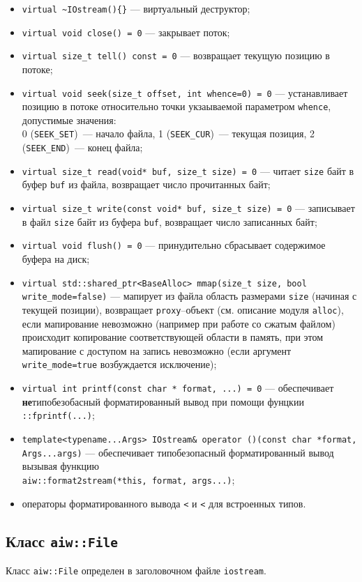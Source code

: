 \begin{itemize}
\item \verb'virtual ~IOstream(){}' --- виртуальный деструктор;
\item \verb'virtual void close() = 0' --- закрывает поток;
\item \verb'virtual size_t tell() const = 0' --- возвращает текущую позицию в потоке;
\item \verb'virtual void seek(size_t offset, int whence=0) = 0' --- устанавливает позицию в потоке относительно
  точки укзаываемой параметром \verb'whence', допустимые значения:\\
  0 (\verb'SEEK_SET')~--- начало файла, 1 (\verb'SEEK_CUR')~--- текущая позиция, 2 (\verb'SEEK_END')~--- конец файла;
\item \verb'virtual size_t read(void* buf, size_t size) = 0' --- читает \verb'size' байт в буфер \verb'buf' из файла,
  возвращает число прочитанных байт;
\item \verb'virtual size_t write(const void* buf, size_t size) = 0' --- записывает в файл \verb'size' байт из буфера \verb'buf',
  возвращает число записанных байт;
\item \verb'virtual void flush() = 0' --- принудительно сбрасывает содержимое буфера на диск;
\item \verb'virtual std::shared_ptr<BaseAlloc> mmap(size_t size, bool write_mode=false)' --- мапирует из файла область
  размерами \verb'size' (начиная с текущей позиции), возвращает \verb'proxy'--объект (см. описание модуля \verb'alloc'),
  если мапирование невозможно (например при работе со сжатым файлом) происходит копирование
  соответствующей области в память, при этом мапирование с доступом на запись невозможно
  (если аргумент \verb'write_mode=true' возбуждается исключение);
\item \verb'virtual int printf(const char * format, ...) = 0' --- обеспечивает
  {\bf не}типобезобасный форматированный вывод при помощи фунцкии \verb'::fprintf(...)';
\item \verb'template<typename...Args> IOstream& operator ()(const char *format, Args...args)' --- обеспечивает
  типобезопасный форматированный вывод вызывая функцию\\  \verb'aiw::format2stream(*this, format, args...)';
\item операторы форматированного вывода \verb'<' и \verb'<' для встроенных типов.
\end{itemize}


\subsection{Класс {\tt aiw::File}}
Класс \verb'aiw::File' определен в заголовочном файле \verb'iostream'.

